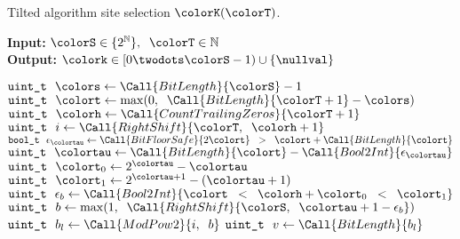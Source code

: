 \begin{algorithm}[H]
\caption{Tilted algorithm site selection $\colorK(\colorT)$.}
\label{alg:tilted-site-selection}
\begin{minipage}{0.53\textwidth}
    \hspace*{\algorithmicindent} \textbf{Input:} $\colorS \in \{2^{\mathbb{N}}\},\;\; \colorT \in \mathbb{N}$ \\
    \hspace*{\algorithmicindent} \textbf{Output:} $\colork \in [0 \twodots \colorS - 1) \cup \{\nullval\}$ 
    \begin{algorithmic}[1]
        \State $\texttt{uint\_t} ~ ~ \colors \gets \Call{BitLength}{\colorS} - 1$
        \State $\texttt{uint\_t} ~ ~ \colort \gets \max(0,\;\; \Call{BitLength}{\colorT+1} - \colors)$ 
        \State $\texttt{uint\_t} ~ ~ \colorh \gets \Call{CountTrailingZeros}{\colorT + 1}$ 
        \Statex
        \State $\texttt{uint\_t} ~ ~ i \gets \Call{RightShift}{\colorT, \;\; \colorh + 1}$ 
        \State $\texttt{bool\_t} ~ ~ \epsilon_{\colortau} \gets \Call{BitFloorSafe}{2\colort} \;\; > \;\; \colort + \Call{BitLength}{\colort}$ 
        \State $\texttt{uint\_t} ~ ~ \colortau \gets  \Call{BitLength}{\colort} - \Call{Bool2Int}{\epsilon_{\colortau}}$ 
        \State $\texttt{uint\_t} ~ ~ \colort_0 \gets 2^{\colortau} - \colortau$ 
        \State $\texttt{uint\_t} ~ ~ \colort_1 \gets 2^{\colortau + 1} - (\colortau + 1)$ 
        \State $\texttt{uint\_t} ~ ~ \epsilon_b \gets \Call{Bool2Int}{\colort \;\; < \;\; \colorh + \colort_0 \;\; < \;\; \colort_1}$ 
        \State $\texttt{uint\_t} ~ ~ b \gets \max(1,\;\; \Call{RightShift}{\colorS, \;\; \colortau + 1 - \epsilon_b})$ 
        \Statex
        \State $\texttt{uint\_t} ~ ~ b_l \gets \Call{ModPow2}{i, \;\; b}$ 
        \Statex {}
        \Statex
        \Statex {}
        \Statex {}
        \Statex
        \State $\texttt{uint\_t} ~ ~ v \gets \Call{BitLength}{b_l}$ 

\end{algorithmic}
\end{minipage}
\end{algorithm}
